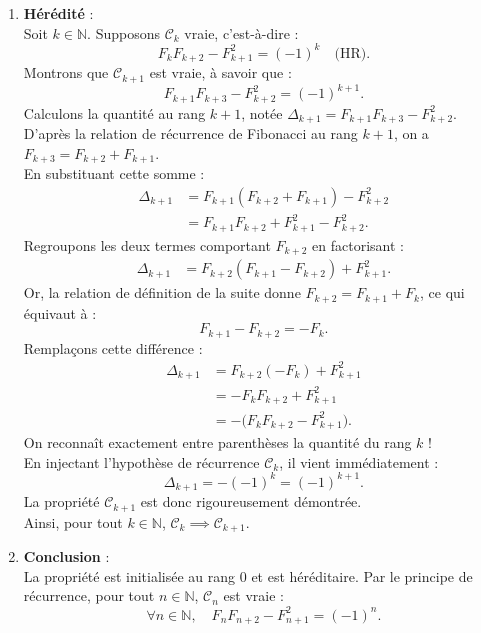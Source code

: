 \documentclass[11pt,a4paper]{article}
\newcommand{\N}{\mathbb{N}}
\begin{document}
\begin{correctionbox}
\begin{enumerate}[label=\textbf{\arabic*.}]
    \item \textbf{Hérédité} :\\
    Soit $k \in \N$. Supposons $\mathcal{C}_k$ vraie, c'est-à-dire :
    \[
    F_k F_{k+2} - F_{k+1}^2 = (-1)^k \quad \text{(HR)}.
    \]
    Montrons que $\mathcal{C}_{k+1}$ est vraie, à savoir que :
    \[
    F_{k+1} F_{k+3} - F_{k+2}^2 = (-1)^{k+1}.
    \]
    Calculons la quantité au rang $k+1$, notée $\Delta_{k+1} = F_{k+1} F_{k+3} - F_{k+2}^2$.\\
    D'après la relation de récurrence de Fibonacci au rang $k+1$, on a $F_{k+3} = F_{k+2} + F_{k+1}$.\\
    En substituant cette somme :
    \begin{align*}
    \Delta_{k+1} &= F_{k+1} (F_{k+2} + F_{k+1}) - F_{k+2}^2 \\
                 &= F_{k+1} F_{k+2} + F_{k+1}^2 - F_{k+2}^2.
    \end{align*}
    Regroupons les deux termes comportant $F_{k+2}$ en factorisant :
    \begin{align*}
    \Delta_{k+1} &= F_{k+2} (F_{k+1} - F_{k+2}) + F_{k+1}^2.
    \end{align*}
    Or, la relation de définition de la suite donne $F_{k+2} = F_{k+1} + F_k$, ce qui équivaut à :
    \[
    F_{k+1} - F_{k+2} = - F_k.
    \]
    Remplaçons cette différence :
    \begin{align*}
    \Delta_{k+1} &= F_{k+2} (-F_k) + F_{k+1}^2 \\
                 &= - F_k F_{k+2} + F_{k+1}^2 \\
                 &= - \Big( F_k F_{k+2} - F_{k+1}^2 \Big).
    \end{align*}
    On reconnaît exactement entre parenthèses la quantité du rang $k$ !\\
    En injectant l'hypothèse de récurrence $\mathcal{C}_k$, il vient immédiatement :
    \[
    \Delta_{k+1} = - (-1)^k = (-1)^{k+1}.
    \]
    La propriété $\mathcal{C}_{k+1}$ est donc rigoureusement démontrée.\\
    Ainsi, pour tout $k \in \N$, $\mathcal{C}_k \implies \mathcal{C}_{k+1}$.

    \item \textbf{Conclusion} :\\
    La propriété est initialisée au rang $0$ et est héréditaire. Par le principe de récurrence, pour tout $n \in \N$, $\mathcal{C}_n$ est vraie :
    \[
    \forall n \in \N, \quad F_n F_{n+2} - F_{n+1}^2 = (-1)^n.
    \]
\end{enumerate}
\end{correctionbox}
\end{document}
